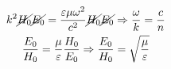 
\begin{gather*}
    k^2\cancel{H_0}\cancel{E_0}=\frac{\varepsilon\mu\omega^2}{c^2}\cancel{H_0}\cancel{E_0} \Rightarrow \frac{\omega}{k}=\frac{c}{n} \\
    \frac{E_0}{H_0}=\frac{\mu}{\varepsilon} \frac{H_0}{E_0}\Rightarrow \frac{E_0}{H_0}=\sqrt{\frac{\mu}{\varepsilon} }      
\end{gather*}


